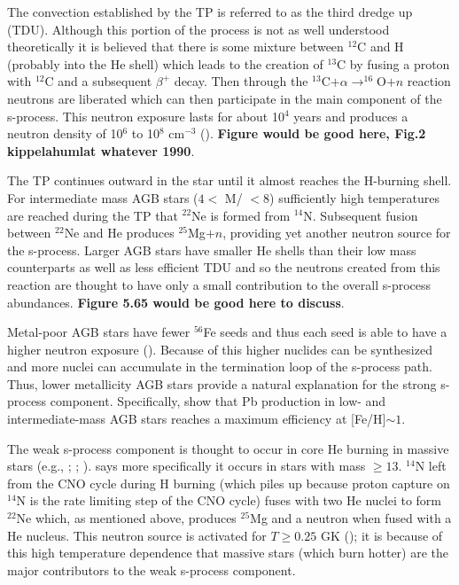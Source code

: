 The convection established by the TP is referred to as the third
dredge up (TDU).  Although this portion of the process is not as well
understood theoretically it is believed that there is some mixture
between $^{12}$C
and H (probably into the He shell) which leads to the creation of
$^{13}$C by fusing a proton 
with $^{12}$C and a subsequent $\beta^+$ decay.  Then through the
$^{13}$C$+ \alpha \rightarrow ^{16}$O$+n$ reaction neutrons are
liberated which can then participate in the main component of the
s-process.  This neutron exposure lasts for about 10$^4$ years and
produces a neutron density of 10$^6$ to 10$^8$ cm$^{-3}$
(\citealt{kappeleretal2011}).  {\bf Figure would be good here, Fig.2
kippelahumlat whatever 1990}.

The TP continues outward in the star until it almost reaches the
H-burning shell.  For intermediate mass  AGB stars ($4<$ M/\Msol
$< 8$) sufficiently high temperatures are reached during the TP that 
 $^{22}$Ne is formed from $^{14}$N.  Subsequent fusion
between $^{22}$Ne and He produces $^{25}$Mg$+n$, providing yet another
neutron source for the s-process.  Larger AGB stars have smaller He
shells than their low mass counterparts as well as less efficient TDU
and so the neutrons created from this reaction are thought to have
only a small contribution to the overall s-process abundances.  {\bf
Figure 5.65 would be good here to discuss}.

Metal-poor AGB stars have fewer $^{56}$Fe seeds and thus each seed is
able to have a higher neutron exposure (\citealt{gallinoetal1998}).
Because of this higher nuclides can be synthesized and more nuclei can
accumulate in the termination loop of the s-process path.  Thus, lower
metallicity AGB stars provide a natural explanation for the strong
s-process component.  Specifically, \cite{travaglioetal2001} show that 
Pb production
in low- and intermediate-mass AGB stars reaches a maximum efficiency
at [Fe/H]$\sim 1$.

The weak s-process component is thought to occur in core He burning in
massive stars
(e.g., \citealt{peters1968}; \citealt{couch1974}; \citealt{raiteri1991}).
\cite{iliadis2008} says more specifically it occurs in stars with mass
$\geq13$\Msol.  $^{14}$N left from the CNO cycle during H burning
(which piles up because proton capture on $^{14}$N is the rate
limiting step of the CNO cycle) fuses with two He nuclei to form
$^{22}$Ne which, as mentioned above, produces $^{25}$Mg and a neutron
when fused with a He nucleus.  This neutron source is activated for
$T \geq 0.25$ GK (\citealt{iliadis2008}); it is because of this high
temperature dependence that massive stars (which burn hotter) are the
major contributors to the weak s-process component.  

